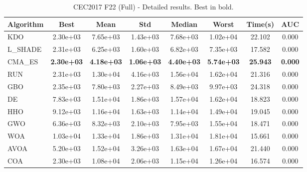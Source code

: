 \begin{table}[H]
\centering\small
\caption{CEC2017 F22 (Full) - Detailed results. Best in bold.}
\label{tab:cec2017_F22}
\begin{tabular}{lccccccc}
\toprule
\textbf{Algorithm} & \textbf{Best} & \textbf{Mean} & \textbf{Std} & \textbf{Median} & \textbf{Worst} & \textbf{Time(s)} & \textbf{AUC} \\
\midrule
KDO & 2.30e+03 & 7.65e+03 & 1.43e+03 & 7.68e+03 & 1.02e+04 & 22.102 & 0.000 \\
L_SHADE & 2.31e+03 & 6.25e+03 & 1.60e+03 & 6.82e+03 & 7.35e+03 & 17.582 & 0.000 \\
CMA_ES & \textbf{2.30e+03} & \textbf{4.18e+03} & \textbf{1.06e+03} & \textbf{4.40e+03} & \textbf{5.74e+03} & \textbf{25.943} & \textbf{0.000} \\
RUN & 2.31e+03 & 1.30e+04 & 4.16e+03 & 1.56e+04 & 1.62e+04 & 21.316 & 0.000 \\
GBO & 2.35e+03 & 7.80e+03 & 2.27e+03 & 8.49e+03 & 9.97e+03 & 24.318 & 0.000 \\
DE & 7.83e+03 & 1.51e+04 & 1.86e+03 & 1.57e+04 & 1.62e+04 & 18.823 & 0.000 \\
HHO & 9.12e+03 & 1.16e+04 & 1.63e+03 & 1.14e+04 & 1.49e+04 & 19.045 & 0.000 \\
GWO & 6.36e+03 & 8.32e+03 & 2.10e+03 & 7.95e+03 & 1.55e+04 & 18.471 & 0.000 \\
WOA & 1.03e+04 & 1.33e+04 & 1.86e+03 & 1.31e+04 & 1.81e+04 & 15.661 & 0.000 \\
AVOA & 5.20e+03 & 1.52e+04 & 3.26e+03 & 1.63e+04 & 1.67e+04 & 21.440 & 0.000 \\
COA & 2.30e+03 & 1.08e+04 & 2.06e+03 & 1.15e+04 & 1.26e+04 & 16.574 & 0.000 \\
\bottomrule
\end{tabular}
\end{table}
